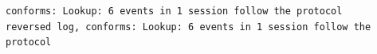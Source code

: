 \begin{lstlisting}[language={},basicstyle=\ttfamily\scriptsize,breaklines=true]
conforms: Lookup: 6 events in 1 session follow the protocol
reversed log, conforms: Lookup: 6 events in 1 session follow the protocol
\end{lstlisting}
